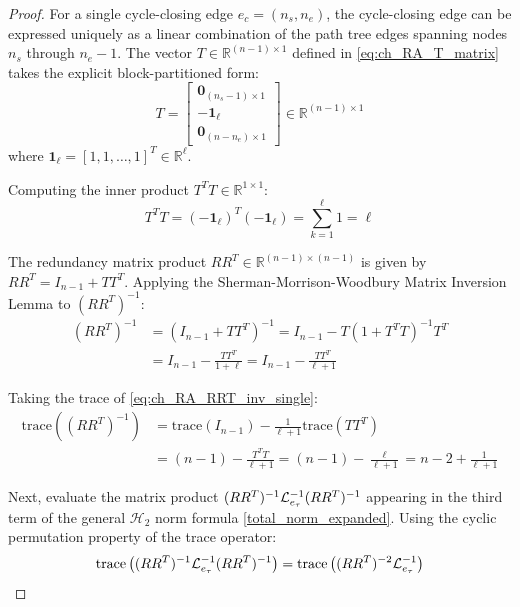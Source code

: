 \begin{proof}
For a single cycle-closing edge $e_c = (n_s, n_e)$, the cycle-closing edge can be expressed uniquely as a linear combination of the path tree edges spanning nodes $n_s$ through $n_e-1$. The vector $T \in \mathbb{R}^{(n-1) \times 1}$ defined in \eqref{eq:ch_RA_T_matrix} takes the explicit block-partitioned form:
\begin{equation}\label{eq:ch_RA_T_single_explicit}
	T = \begin{bmatrix} \mathbf{0}_{(n_s-1) \times 1} \\ -\mathbf{1}_\ell \\ \mathbf{0}_{(n-n_e) \times 1} \end{bmatrix} \in \mathbb{R}^{(n-1) \times 1}
\end{equation}
where $\mathbf{1}_\ell = [1, 1, \dots, 1]^T \in \mathbb{R}^\ell$.

Computing the inner product $T^T T \in \mathbb{R}^{1 \times 1}$:
\begin{equation}
	T^T T = (-\mathbf{1}_\ell)^T (-\mathbf{1}_\ell) = \sum_{k=1}^{\ell} 1 = \ell
\end{equation}

The redundancy matrix product $R R^T \in \mathbb{R}^{(n-1) \times (n-1)}$ is given by $R R^T = I_{n-1} + T T^T$. Applying the Sherman-Morrison-Woodbury Matrix Inversion Lemma to $(R R^T)^{-1}$:
\begin{align}\label{eq:ch_RA_RRT_inv_single}
	(R R^T)^{-1} &= (I_{n-1} + T T^T)^{-1} = I_{n-1} - T (1 + T^T T)^{-1} T^T \nonumber \\
	&= I_{n-1} - \frac{T T^T}{1 + \ell} = I_{n-1} - \frac{T T^T}{\ell + 1}
\end{align}

Taking the trace of \eqref{eq:ch_RA_RRT_inv_single}:
\begin{align}\label{eq:ch_RA_RRT_trace_proof}
	\text{trace}\left( (R R^T)^{-1} \right) &= \text{trace}(I_{n-1}) - \frac{1}{\ell+1} \text{trace}(T T^T) \nonumber \\
	&= (n-1) - \frac{T^T T}{\ell+1} = (n-1) - \frac{\ell}{\ell+1} = n - 2 + \frac{1}{\ell+1}
\end{align}

Next, evaluate the matrix product $(R R^T)^{-1} \mathcal{L}_{e_{\tau}}^{-1} (R R^T)^{-1}$ appearing in the third term of the general $\mathcal{H}_2$ norm formula \eqref{total_norm_expanded}. Using the cyclic permutation property of the trace operator:
\begin{equation}\label{eq:ch_RA_trace_perm_proof}
	\text{trace}\left( (R R^T)^{-1} \mathcal{L}_{e_{\tau}}^{-1} (R R^T)^{-1} \right) = \text{trace}\left( (R R^T)^{-2} \mathcal{L}_{e_{\tau}}^{-1} \right)
\end{equation}


\end{proof}
